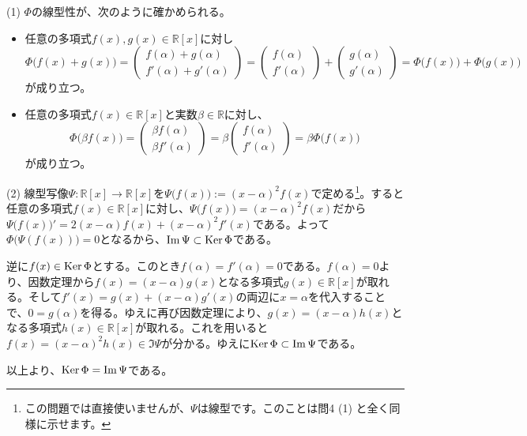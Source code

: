 \noindent (1) $\Phi$の線型性が、次のように確かめられる。
\begin{itemize}
\item 任意の多項式$f(x), g(x) \in \mathbb{R}[x]$に対し
\[
\Phi\bigl(f(x) + g(x)\bigr) = 
\begin{pmatrix}
f(\alpha) + g(\alpha) \\
f'(\alpha) + g'(\alpha)
\end{pmatrix}
=
\begin{pmatrix}
f(\alpha) \\
f'(\alpha)
\end{pmatrix}
+
\begin{pmatrix}
g(\alpha) \\
g'(\alpha)
\end{pmatrix}
= \Phi\bigl(f(x)\bigr) + \Phi\bigl(g(x)\bigr)
\]
が成り立つ。
\item 任意の多項式$f(x) \in \mathbb{R}[x]$と実数$\beta \in \mathbb{R}$に対し、
\[
\Phi\bigl(\beta f(x)\bigr) =
\begin{pmatrix}
\beta f(\alpha) \\
\beta f'(\alpha) 
\end{pmatrix}
=
\beta
\begin{pmatrix}
f(\alpha) \\
f'(\alpha) 
\end{pmatrix}
= \beta\Phi\bigl(f(x)\bigr)
\]
が成り立つ。
\end{itemize}

\noindent (2) 線型写像$\Psi\colon\mathbb{R}[x]\rightarrow\mathbb{R}[x]$を$\Psi\bigl(f(x)\bigr) := (x - \alpha)^2 f(x)$で定める\footnote{この問題では直接使いませんが、$\Psi$は線型です。このことは問4 (1) と全く同様に示せます。}。すると任意の多項式$f(x) \in \mathbb{R}[x]$に対し、$\Psi\bigl(f(x)\bigr) = (x - \alpha)^2 f(x)$だから$\Psi\bigl(f(x)\bigr)' = 2(x - \alpha)f(x) + (x - \alpha)^2f'(x)$である。よって$\Phi\bigl(\Psi(f(x))\bigr) = 0$となるから、$\mathrm{Im}\,\Psi \subset \operatorname{Ker}\Phi$である。

逆に$f(x) \in \operatorname{Ker}\Phi$とする。このとき$f(\alpha) = f'(\alpha) = 0$である。$f(\alpha) = 0$より、因数定理から$f(x) = (x - \alpha) g(x)$となる多項式$g(x) \in \mathbb{R}[x]$が取れる。そして$f'(x) = g(x) + (x - \alpha)g'(x)$の両辺に$x = \alpha$を代入することで、$0 = g(\alpha)$を得る。ゆえに再び因数定理により、$g(x) = (x - \alpha)h(x)$となる多項式$h(x)\in\mathbb{R}[x]$が取れる。これを用いると$f(x) = (x - \alpha)^2 h(x) \in \Im\Psi$が分かる。ゆえに$\operatorname{Ker} \Phi \subset \mathrm{Im}\, \Psi$である。

以上より、$\operatorname{Ker}\Phi = \mathrm{Im}\, \Psi$である。

